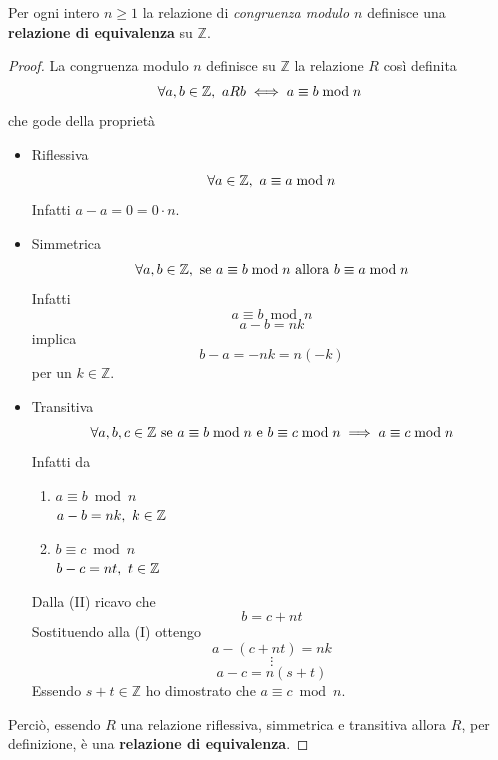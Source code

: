 \documentclass[a4paper,12pt, oneside]{book}
\begin{document}
		\begin{teorema}
			Per ogni intero $n \geq 1$ la relazione di \textit{congruenza modulo $n$} definisce una \textbf{relazione di equivalenza} su $\mathbb{Z}$.
					
			\begin{proof}
				La congruenza modulo $n$ definisce su $\mathbb{Z}$ la relazione $R$ così definita
				$$\forall a,b \in \mathbb{Z}, \mbox{\space} aRb \iff a \equiv b \bmod n$$
				che gode della proprietà
				\begin{itemize}
					\item Riflessiva
						$$\forall a \in \mathbb{Z}, \mbox{\space} a \equiv a \bmod n$$
						Infatti $a-a=0=0 \cdot n$.
					\item Simmetrica
						$$\forall a,b \in \mathbb{Z}, \mbox{\space se } a \equiv b \bmod n \mbox{ allora } b \equiv a \bmod n$$
						Infatti
						$$a \equiv b \bmod n$$ $$a-b=nk$$
						implica
						$$b-a=-nk = n(-k)$$
						per un $k \in \mathbb{Z}$.
					\item Transitiva
						$$\forall a,b,c \in \mathbb{Z} \mbox{\space se } a \equiv b \bmod n \mbox{ e } b \equiv c \bmod n \implies a \equiv c \bmod n$$
						Infatti da \begin{enumerate}[label=\Roman*) ]
							\item $a \equiv b \bmod n$\\
								$a-b = nk, \mbox{\space} k \in \mathbb{Z}$
							\item $b \equiv c \bmod n$\\
								$b-c = nt, \mbox{\space} t \in \mathbb{Z}$
						\end{enumerate}
						Dalla (II) ricavo che
						$$b = c+nt$$
						Sostituendo alla (I) ottengo
						$$a-(c+nt) = nk$$
						$$\vdots$$
						$$a-c = n(s+t)$$
						Essendo $s+t \in \mathbb{Z}$ ho dimostrato che $a \equiv c \bmod n$.
				\end{itemize}
				Perciò, essendo $R$ una relazione riflessiva, simmetrica e transitiva allora $R$, per definizione, è una \textbf{relazione di equivalenza}.
			\end{proof}
		\end{teorema}
\end{document}
